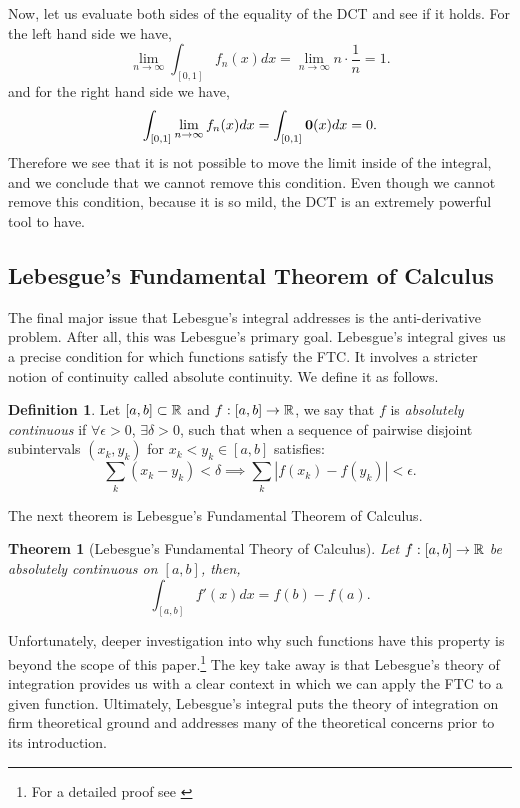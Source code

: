 \documentclass{article}
\newtheorem{theorem}{Theorem}
\theoremstyle{axiom} \newtheorem{axiom}{Axiom}
\theoremstyle{definition} \newtheorem{definition}{Definition}
\theoremstyle{example} \newtheorem{example}{Example}
\theoremstyle{proposition} \newtheorem{prop}{Proposition}
\theoremstyle{lemma} \newtheorem{lemma}{Lemma}
\begin{document}
Now, let us evaluate both sides of the equality of the DCT and see if it holds. 
For the left hand side we have,
\begin{equation*}
	\lim_{n\rightarrow \infty} \int_{[0,1]} f_n(x) dx = 
	\lim_{n\rightarrow \infty} n\cdot \frac{1}{n} = 1.
\end{equation*}
and for the right hand side we have,
\begin{equation*}
	\int_{[0,1]} \lim_{n\rightarrow \infty} f_n(x) dx = 
	\int_{[0,1]} \bold{0}(x) dx = 0.
\end{equation*}
Therefore we see that it is not possible to move the limit inside of the
integral, and we conclude that we cannot remove this condition. 
Even though we cannot remove this condition, because it is so mild, the DCT is 
an extremely powerful tool to have.

\subsection{Lebesgue's Fundamental Theorem of Calculus}

The final major issue that Lebesgue's integral addresses is the anti-derivative
problem. After all, this was Lebesgue's primary goal. Lebesgue's 
integral gives us a precise condition for which functions satisfy the FTC. It 
involves a stricter notion of continuity called absolute continuity. We define 
it as follows.
\begin{definition}
	Let $[a,b] \subset \mathbb{R}$ and $f:[a,b] \rightarrow \mathbb{R}$, we say that $f$ is 
	\textit{absolutely continuous} if $\forall \epsilon  > 0$, $\exists \delta
	>0$, such that when a sequence of pairwise disjoint subintervals $(x_k,y_k)$
	for $x_k < y_k \in [a,b]$ satisfies:
	\begin{equation}
		\sum_{k} (x_k - y_k) < \delta \implies \sum_{k} |f(x_k) - f(y_k) | < \epsilon.
	\end{equation}
\end{definition}

The next theorem is Lebesgue's Fundamental Theorem of Calculus.
\begin{theorem}[Lebesgue's Fundamental Theory of Calculus]
	Let $f:[a,b] \rightarrow \mathbb{R}$ be absolutely continuous on $[a,b]$, 
	then,
	\begin{equation}
		\int_{[a,b]} f'(x) dx = f(b) - f(a).
	\end{equation}
\end{theorem}
Unfortunately, deeper investigation into why such functions have this property is
beyond the scope of this paper.\footnote{For a detailed proof see \cite{pouso:2012}}
The key take away is that Lebesgue's theory of 
integration provides us with a clear context in which we can apply 
the FTC to a given function. Ultimately, Lebesgue's integral puts the theory of 
integration on firm theoretical ground and addresses many of the theoretical 
concerns prior to its introduction.

\newpage

\end{document}

